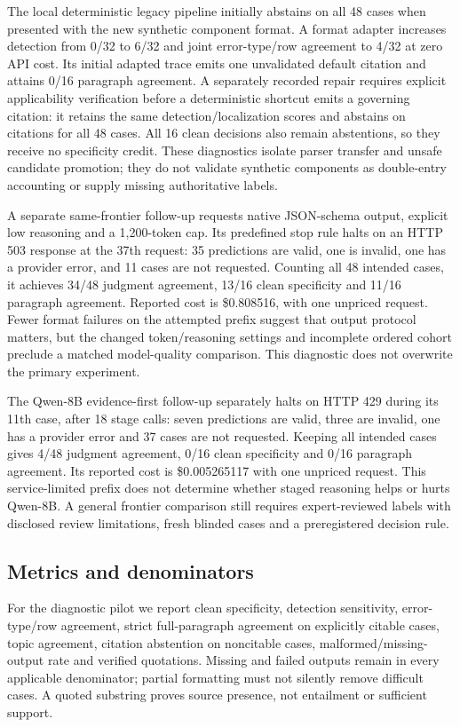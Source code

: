 \documentclass[11pt]{article}
\begin{document}
The local deterministic legacy pipeline initially abstains on all 48 cases when presented with the new synthetic component format. A format adapter increases detection from 0/32 to 6/32 and joint error-type/row agreement to 4/32 at zero API cost. Its initial adapted trace emits one unvalidated default citation and attains 0/16 paragraph agreement. A separately recorded repair requires explicit applicability verification before a deterministic shortcut emits a governing citation: it retains the same detection/localization scores and abstains on citations for all 48 cases. All 16 clean decisions also remain abstentions, so they receive no specificity credit. These diagnostics isolate parser transfer and unsafe candidate promotion; they do not validate synthetic components as double-entry accounting or supply missing authoritative labels.

A separate same-frontier follow-up requests native JSON-schema output, explicit low reasoning and a 1,200-token cap. Its predefined stop rule halts on an HTTP 503 response at the 37th request: 35 predictions are valid, one is invalid, one has a provider error, and 11 cases are not requested. Counting all 48 intended cases, it achieves 34/48 judgment agreement, 13/16 clean specificity and 11/16 paragraph agreement. Reported cost is \$0.808516, with one unpriced request. Fewer format failures on the attempted prefix suggest that output protocol matters, but the changed token/reasoning settings and incomplete ordered cohort preclude a matched model-quality comparison. This diagnostic does not overwrite the primary experiment.

The Qwen-8B evidence-first follow-up separately halts on HTTP 429 during its 11th case, after 18 stage calls: seven predictions are valid, three are invalid, one has a provider error and 37 cases are not requested. Keeping all intended cases gives 4/48 judgment agreement, 0/16 clean specificity and 0/16 paragraph agreement. Its reported cost is \$0.005265117 with one unpriced request. This service-limited prefix does not determine whether staged reasoning helps or hurts Qwen-8B. A general frontier comparison still requires expert-reviewed labels with disclosed review limitations, fresh blinded cases and a preregistered decision rule.

\subsection{Metrics and denominators}
For the diagnostic pilot we report clean specificity, detection sensitivity, error-type/row agreement, strict full-paragraph agreement on explicitly citable cases, topic agreement, citation abstention on noncitable cases, malformed/missing-output rate and verified quotations. Missing and failed outputs remain in every applicable denominator; partial formatting must not silently remove difficult cases. A quoted substring proves source presence, not entailment or sufficient support.
\end{document}
